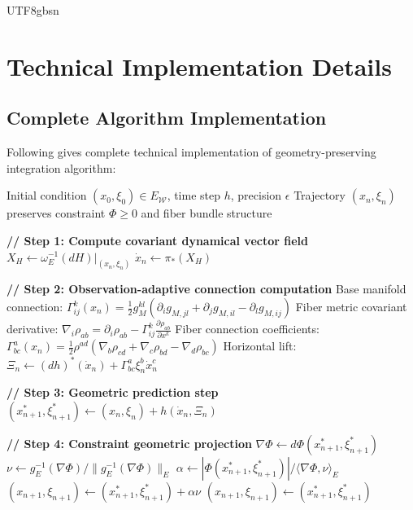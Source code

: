 \documentclass[a4paper,12pt]{extarticle}
\theoremstyle{definition}
\begin{document}
\begin{CJK}{UTF8}{gbsn}
\section{Technical Implementation Details}
\label{appendix:technical_details}

\subsection{Complete Algorithm Implementation}
\label{appendix:algorithm_details}

Following gives complete technical implementation of geometry-preserving integration algorithm:

\begin{algorithm}[H]
\caption{Observation Constraint-Preserving Integration Algorithm (Complete Version)}
\label{alg:geometric_integrator}
\begin{algorithmic}[1]
\Require Initial condition $(x_0, \xi_0) \in E_{\mathcal{W}}$, time step $h$, precision $\epsilon$
\Ensure Trajectory $(x_n, \xi_n)$ preserves constraint $\Phi \geq 0$ and fiber bundle structure

    \State \textbf{// Step 1: Compute covariant dynamical vector field}
    \State $X_H \leftarrow \omega_E^{-1}(dH)|_{(x_n, \xi_n)}$ 
    \State $\dot{x}_n \leftarrow \pi_*(X_H)$ 
    
    \State \textbf{// Step 2: Observation-adaptive connection computation}
    \State Base manifold connection: $\Gamma^k_{ij}(x_n) = \frac{1}{2}g_M^{kl}(\partial_i g_{M,jl} + \partial_j g_{M,il} - \partial_l g_{M,ij})$
    \State Fiber metric covariant derivative: $\nabla_i \rho_{ab} = \partial_i \rho_{ab} - \Gamma^k_{ij}\frac{\partial \rho_{ab}}{\partial x^k}$
    \State Fiber connection coefficients: $\Gamma^a_{bc}(x_n) = \frac{1}{2}\rho^{ad}(\nabla_b \rho_{cd} + \nabla_c \rho_{bd} - \nabla_d \rho_{bc})$
    \State Horizontal lift: $\Xi_n \leftarrow (dh)^*(\dot{x}_n) + \Gamma^a_{bc}\xi_n^b\dot{x}_n^c$
    
    \State \textbf{// Step 3: Geometric prediction step}
    \State $(x^*_{n+1}, \xi^*_{n+1}) \leftarrow (x_n, \xi_n) + h(\dot{x}_n, \Xi_n)$
    
    \State \textbf{// Step 4: Constraint geometric projection}
        \State $\nabla\Phi \leftarrow d\Phi(x^*_{n+1}, \xi^*_{n+1})$
        \State $\nu \leftarrow g_E^{-1}(\nabla\Phi)/\|g_E^{-1}(\nabla\Phi)\|_E$ 
        \State $\alpha \leftarrow |\Phi(x^*_{n+1}, \xi^*_{n+1})|/\langle\nabla\Phi, \nu\rangle_E$
        \State $(x_{n+1}, \xi_{n+1}) \leftarrow (x^*_{n+1}, \xi^*_{n+1}) + \alpha\nu$
    \Else
        \State $(x_{n+1}, \xi_{n+1}) \leftarrow (x^*_{n+1}, \xi^*_{n+1})$
    \EndIf
    

\end{algorithmic}
\end{algorithm}
\end{CJK}
\end{document}
